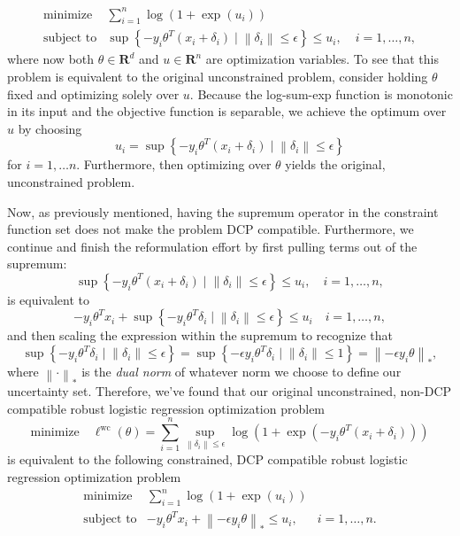 \documentclass[12pt,reqno]{article}
\theoremstyle{definition}
\numberwithin{equation}{section}
\begin{document}
\[\begin{array}{lll}
\text{minimize} \; & \sum_{i=1}^n \log \left(1+\exp \left(u_i\right)\right) & \\
\text{subject to} & \sup \left\{-y_i \theta^T\left(x_i+\delta_i\right) \mid \left\lVert \delta_i \right\rVert \le \epsilon \right\} \le u_i, \; & i = 1, \ldots, n,
\end{array}\]
where now both $\theta \in \mathbf{R}^d$ and $u \in \mathbf{R}^n$ are optimization variables.
To see that this problem is equivalent to the original unconstrained problem, consider holding $\theta$ fixed
and optimizing solely over $u$. Because the log-sum-exp function is monotonic in its input and the objective function
is separable, we achieve the optimum over $u$ by choosing
\[u_i = \sup \left\{-y_i \theta^T\left(x_i+\delta_i\right) \mid \left\lVert \delta_i \right\rVert \le \epsilon \right\} \]
for $i = 1, \ldots n$. Furthermore, then optimizing over $\theta$ yields the original, unconstrained problem.

Now, as previously mentioned, having the supremum operator in the constraint function set does not
make the problem DCP compatible. Furthermore, we continue and finish the reformulation effort by first
pulling terms out of the supremum:
\[\sup \left\{-y_i \theta^T\left(x_i+\delta_i\right) \mid \left\lVert \delta_i \right\rVert \le \epsilon \right\} \le u_i, \quad i = 1, \ldots, n,\]
is equivalent to
\[-y_i\theta^Tx_i + \sup \left\{ -y_i \theta^T \delta_i \mid \left\lVert \delta_i \right\rVert \le \epsilon \right\} \le u_i \quad i = 1, \ldots, n,\]
and then scaling the expression within the supremum
to recognize that 
\[\sup \left\{ -y_i \theta^T \delta_i \mid \left\lVert \delta_i \right\rVert \le \epsilon \right\} = \sup \left\{ -\epsilon y_i \theta^T \delta_i \mid \left\lVert \delta_i \right\rVert \le 1 \right\} = \left\lVert -\epsilon y_i \theta \right\rVert_{*},\]
where $\left\lVert \cdot \right\rVert_{*}$ is the \textit{dual norm} of whatever norm we choose to define our uncertainty set.
Therefore, we've found that our original unconstrained, non-DCP compatible robust logistic regression optimization problem
\[\mathrm{minimize} \quad \ell^{\mathrm{wc}}(\theta)=\sum_{i=1}^n \sup _{\left\|\delta_i\right\| \leq \epsilon} \log \left(1+\exp \left(-y_i \theta^T\left(x_i+\delta_i\right)\right)\right)\]
is equivalent to the following constrained, DCP compatible robust logistic regression optimization problem
\[\begin{array}{lll}
    \text{minimize} \; & \sum_{i=1}^n \log \left(1+\exp \left(u_i\right)\right) & \\
    \text{subject to} & -y_i\theta^Tx_i + \left\lVert -\epsilon y_i \theta \right\rVert_{*} \le u_i, \; & i = 1, \ldots, n.
    \end{array}\]
\end{document}
